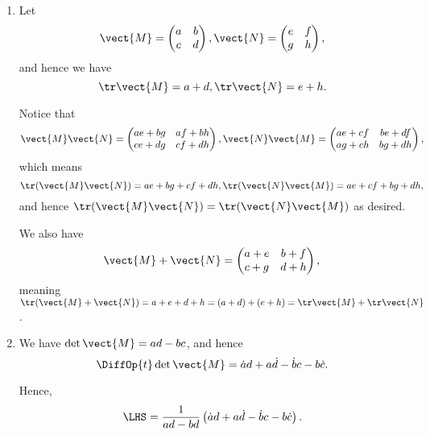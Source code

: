 \Question{\currfilebase}
\begin{enumerate}
    \item Let
          \[
              \vect{M} = \begin{pmatrix}
                  a & b \\ c & d
              \end{pmatrix},
              \vect{N} = \begin{pmatrix}
                  e & f \\ g & h
              \end{pmatrix},
          \]
          and hence we have
          \[
              \tr \vect{M} = a + d, \tr \vect{N} = e + h.
          \]

          Notice that
          \[
              \vect{M} \vect{N} = \begin{pmatrix}
                  ae + bg & af + bh \\ ce + dg & cf + dh
              \end{pmatrix},
              \vect{N} \vect{M} = \begin{pmatrix}
                  ae + cf & be + df \\ ag + ch & bg + dh
              \end{pmatrix},
          \]
          which means
          \[
              \tr(\vect{M} \vect{N}) = ae + bg + cf + dh, \tr(\vect{N} \vect{M}) = ae + cf + bg + dh,
          \]
          and hence \(\tr (\vect{M} \vect{N}) = \tr (\vect{N} \vect{M})\) as desired.

          We also have
          \[
              \vect{M} + \vect{N} = \begin{pmatrix}
                  a + e & b + f \\ c + g & d + h
              \end{pmatrix},
          \]
          meaning \(\tr(\vect{M} + \vect{N}) = a + e + d + h = (a + d) + (e + h) = \tr \vect{M} + \tr \vect{N}\).

    \item We have \(\det \vect{M} = ad - bc\), and hence
          \[
              \DiffOp{t} \det \vect{M} = \dot{a} d + a \dot{d} - \dot{b} c - b \dot{c}.
          \]

          Hence,
          \[
              \LHS = \frac{1}{ad - bd} \left(\dot{a} d + a \dot{d} - \dot{b} c - b \dot{c}\right).
          \]


\end{enumerate}

